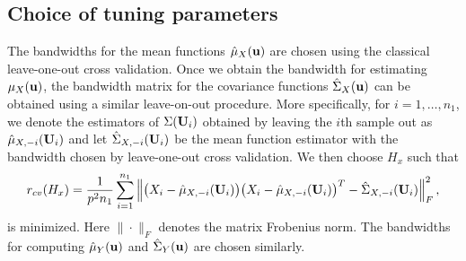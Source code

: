 \documentclass[11pt]{article}
\theoremstyle{definition}
\begin{document}
 \subsection{Choice of tuning parameters}
 The bandwidths for the mean functions $\hat{\mu}_X({\bf u})$ are chosen using the classical leave-one-out cross validation. Once we obtain the bandwidth for estimating ${\mu}_X({\bf u})$, the bandwidth matrix for the covariance functions $\hat{\Sigma}_X({\bf u})$ can be obtained using a similar leave-on-out procedure. More specifically, for $i=1,\ldots, n_1$, we denote the estimators of $\Sigma({\bf U}_i)$ obtained by leaving the $i$th sample out as $\hat{\mu}_{X,-i}({\bf U}_i)$ and let $\hat{\Sigma}_{X,-i}({\bf U}_i) $ be the mean function estimator with the bandwidth chosen by leave-one-out cross validation. We then choose $H_x$ such that
 \begin{eqnarray}\label{cvh}
 	r_{cv}(H_x)=\frac{1}{p^2n_1}\sum_{i=1}^{n_1}\left\| \big(X_{i}-\hat{\mu}_{X,-i}({\bf U}_i)\big) \big(X_{i}-\hat{\mu}_{X,-i}({\bf U}_i)\big)^T-\hat{\Sigma}_{X,-i}({\bf U}_i) 
 	\right\|_F^2,
 \end{eqnarray}
 is minimized. Here $\|\cdot\|_F$ denotes the matrix Frobenius norm. The bandwidths  for computing $\hat{\mu}_Y({\bf u})$ and $\hat{\Sigma}_Y({\bf u})$ are chosen similarly. %
 
\end{document}

